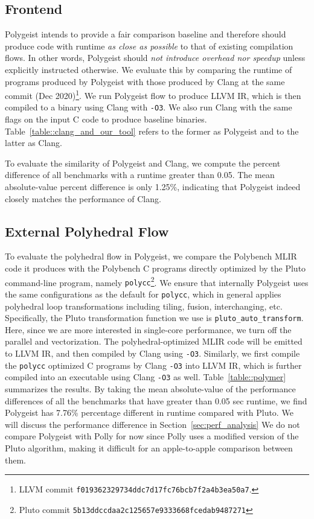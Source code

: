\documentclass[sigplan]{acmart}
\newcommand{\icode}[1]{{\texttt {#1}}}
\newcommand{\tool}{Polygeist\xspace}
\newcommand{\polycc}{\icode{polycc}\xspace}
\begin{document}
\subsection{Frontend}
\label{sub:frontend}
\tool intends to provide a fair comparison baseline and therefore should produce code with runtime \emph{as close as possible} to that of existing compilation flows. In other words, \tool should \emph{not introduce overhead nor speedup} unless explicitly instructed otherwise. We evaluate this by comparing the runtime of programs produced by \tool with those produced by Clang at the same commit (Dec 2020)\footnote{LLVM commit \icode{f019362329734ddc7d17fc76bcb7f2a4b3ea50a7}.}. We run \tool flow to produce LLVM IR, which is then compiled to a binary using Clang with \icode{-O3}. We also run Clang with the same flags on the input C code to produce baseline binaries. Table~\ref{table::clang_and_our_tool} refers to the former as \tool and to the latter as Clang.

To evaluate the similarity of \tool and Clang, we compute the percent difference of all benchmarks with a runtime greater than 0.05. The mean absolute-value percent difference is only 1.25\%, indicating that \tool indeed closely matches the performance of Clang.

\subsection{External Polyhedral Flow}
\label{sub:polymer}

To evaluate the polyhedral flow in \tool, we compare the Polybench MLIR code it produces with the Polybench C programs directly optimized by the Pluto command-line program, namely \polycc \footnote{Pluto commit \icode{5b13ddccdaa2c125657e9333668fcedab9487271}}.
We ensure that internally \tool uses the same configurations as the default for \polycc, which in general applies polyhedral loop transformations including tiling, fusion, interchanging, etc.
Specifically, the Pluto transformation function we use is \icode{pluto\_auto\_transform}.
Here, since we are more interested in single-core performance, we turn off the parallel and vectorization.
The polyhedral-optimized MLIR code will be emitted to LLVM IR, and then compiled by Clang using \icode{-O3}. 
Similarly, we first compile the \polycc optimized C programs by Clang \icode{-O3} into LLVM IR, which is further compiled into an executable using Clang \icode{-O3} as well.
Table~\ref{table::polymer} summarizes the results.
By taking the mean absolute-value of the performance differences of all the benchmarks that have greater than 0.05 sec runtime, we find \tool has 7.76\% percentage different in runtime compared with Pluto. We will discuss the performance difference in Section~\ref{sec:perf_analysis}
We do not compare \tool with Polly for now since Polly uses a modified version of the Pluto algorithm, making it difficult for an apple-to-apple comparison between them.
\end{document}
